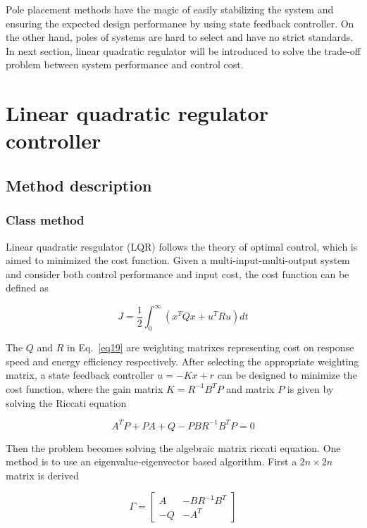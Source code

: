 \documentclass[hyperref]{article}
\theoremstyle{nonumberplain}
\begin{document}
	Pole placement methods have the magic of easily stabilizing the system and ensuring the expected design performance by using state feedback controller. On the other hand, poles of systems are hard to select and have no strict standards. In next section, linear quadratic regulator will be introduced to solve the trade-off problem between system performance and control cost.
	
	
	\section{Linear quadratic regulator controller}
	
	\subsection{Method description}
	
	\subsubsection{Class method}
	
	\hspace{1.0em}
	Linear quadratic resgulator (LQR) follows the theory of optimal control, which is aimed to minimized the cost function. Given a multi-input-multi-output system and consider both control performance and input cost, the cost function can be defined as
	
	\begin{equation}
	J=\frac{1}{2}\int_{0}^{\infty}(x^{T}Qx+u^{T}Ru)dt
	\label{eq19}
	\end{equation}
	
	The $Q$ and $R$ in Eq.~\ref{eq19} are weighting matrixes representing cost on response speed and energy efficiency respectively. After selecting the appropriate weighting matrix, a state feedback controller $u=-Kx+r$ can be designed to minimize the cost function, where the gain matrix $K=R^{-1}B^{T}P$ and matrix $P$ is given by solving the Riccati equation
	
	\begin{equation}
	A^{T}P+PA+Q-PBR^{-1}B^{T}P=0
	\label{eq20}
	\end{equation}
	
	Then the problem becomes solving the algebraic matrix riccati equation. One method is to use an eigenvalue-eigenvector based algorithm. First a $2n \times 2n$ matrix is derived
	
	\begin{equation}
	\Gamma =\begin{bmatrix}
	A &-BR^{-1}B^{T} \\ 
	-Q &-A^{T} 
	\end{bmatrix}
	\label{eq21}
	\end{equation}
	
\end{document}
